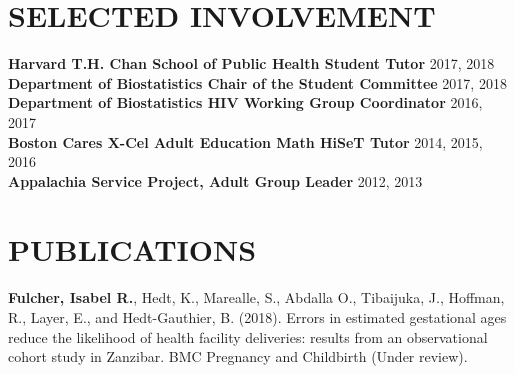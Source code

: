 \documentclass[12pt]{article}
\begin{document}
\section*{\textbf{{\large S}{ELECTED} {\large I}{NVOLVEMENT}}}
\textbf{Harvard T.H. Chan School of Public Health Student Tutor} \hfill \hfill 2017, 2018 \\
\textbf{Department of Biostatistics Chair of the Student Committee} \hfill \hfill 2017, 2018 \\
\textbf{Department of Biostatistics HIV Working Group Coordinator} \hfill \hfill 2016, 2017 \\
\textbf{Boston Cares X-Cel Adult Education Math HiSeT Tutor} \hfill \hfill 2014, 2015, 2016 \\
\textbf{Appalachia Service Project, Adult Group Leader} \hfill \hfill 2012, 2013

\section*{\textbf{{\large P}{UBLICATIONS}}}









\textbf{Fulcher, Isabel R.}, Hedt, K., Marealle, S., Abdalla O., Tibaijuka, J., Hoffman, R., Layer, E., and Hedt-Gauthier, B. (2018). Errors in estimated gestational ages reduce the likelihood of health facility deliveries: results from an observational cohort study in Zanzibar. BMC Pregnancy and Childbirth (Under review). \\
\end{document}
